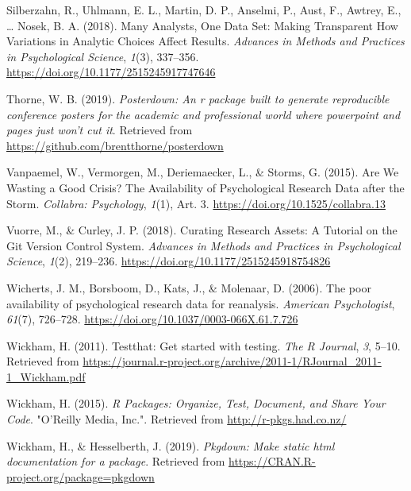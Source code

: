 \documentclass[
  english,
  jou,floatsintext]{apa6}
\newlength{\cslhangindent}
\newenvironment{cslreferences}%
  {\setlength{\parindent}{0pt}%
  \everypar{\setlength{\hangindent}{\cslhangindent}}\ignorespaces}%
  {\par}
\begin{document}
\begin{cslreferences}
\leavevmode\hypertarget{ref-SilberzahnManyAnalystsOne2018}{}%
Silberzahn, R., Uhlmann, E. L., Martin, D. P., Anselmi, P., Aust, F., Awtrey, E., \ldots{} Nosek, B. A. (2018). Many Analysts, One Data Set: Making Transparent How Variations in Analytic Choices Affect Results. \emph{Advances in Methods and Practices in Psychological Science}, \emph{1}(3), 337--356. \url{https://doi.org/10.1177/2515245917747646}

\leavevmode\hypertarget{ref-R-posterdown}{}%
Thorne, W. B. (2019). \emph{Posterdown: An r package built to generate reproducible conference posters for the academic and professional world where powerpoint and pages just won't cut it}. Retrieved from \url{https://github.com/brentthorne/posterdown}

\leavevmode\hypertarget{ref-VanpaemelAreWeWasting2015}{}%
Vanpaemel, W., Vermorgen, M., Deriemaecker, L., \& Storms, G. (2015). Are We Wasting a Good Crisis? The Availability of Psychological Research Data after the Storm. \emph{Collabra: Psychology}, \emph{1}(1), Art. 3. \url{https://doi.org/10.1525/collabra.13}

\leavevmode\hypertarget{ref-VuorreCuratingResearchAssets2018}{}%
Vuorre, M., \& Curley, J. P. (2018). Curating Research Assets: A Tutorial on the Git Version Control System. \emph{Advances in Methods and Practices in Psychological Science}, \emph{1}(2), 219--236. \url{https://doi.org/10.1177/2515245918754826}

\leavevmode\hypertarget{ref-Wichertspooravailabilitypsychological2006}{}%
Wicherts, J. M., Borsboom, D., Kats, J., \& Molenaar, D. (2006). The poor availability of psychological research data for reanalysis. \emph{American Psychologist}, \emph{61}(7), 726--728. \url{https://doi.org/10.1037/0003-066X.61.7.726}

\leavevmode\hypertarget{ref-R-testthat}{}%
Wickham, H. (2011). Testthat: Get started with testing. \emph{The R Journal}, \emph{3}, 5--10. Retrieved from \url{https://journal.r-project.org/archive/2011-1/RJournal_2011-1_Wickham.pdf}

\leavevmode\hypertarget{ref-WickhamPackagesOrganizeTest2015}{}%
Wickham, H. (2015). \emph{R Packages: Organize, Test, Document, and Share Your Code}. "O'Reilly Media, Inc.". Retrieved from \url{http://r-pkgs.had.co.nz/}

\leavevmode\hypertarget{ref-R-pkgdown}{}%
Wickham, H., \& Hesselberth, J. (2019). \emph{Pkgdown: Make static html documentation for a package}. Retrieved from \url{https://CRAN.R-project.org/package=pkgdown}


\end{cslreferences}
\end{document}
